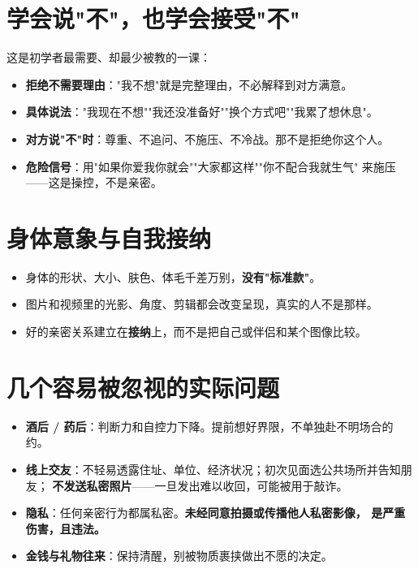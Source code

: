 \section{学会说"不"，也学会接受"不"}

这是初学者最需要、却最少被教的一课：

\begin{itemize}[leftmargin=2em]
  \item \textbf{拒绝不需要理由}："我不想"就是完整理由，不必解释到对方满意。
  \item \textbf{具体说法}："我现在不想""我还没准备好""换个方式吧""我累了想休息"。
  \item \textbf{对方说"不"时}：尊重、不追问、不施压、不冷战。那不是拒绝你这个人。
  \item \textbf{危险信号}：用"如果你爱我你就会""大家都这样""你不配合我就生气"
        来施压——这是操控，不是亲密。
\end{itemize}

\section{身体意象与自我接纳}

\begin{itemize}[leftmargin=2em]
  \item 身体的形状、大小、肤色、体毛千差万别，\textbf{没有"标准款"}。
  \item 图片和视频里的光影、角度、剪辑都会改变呈现，真实的人不是那样。
  \item 好的亲密关系建立在\textbf{接纳}上，而不是把自己或伴侣和某个图像比较。
\end{itemize}

\section{几个容易被忽视的实际问题}

\begin{itemize}[leftmargin=2em]
  \item \textbf{酒后 / 药后}：判断力和自控力下降。提前想好界限，不单独赴不明场合的约。
  \item \textbf{线上交友}：不轻易透露住址、单位、经济状况；初次见面选公共场所并告知朋友；
        \textbf{不发送私密照片}——一旦发出难以收回，可能被用于敲诈。
  \item \textbf{隐私}：任何亲密行为都属私密。\textbf{未经同意拍摄或传播他人私密影像，
        是严重伤害，且违法。}
  \item \textbf{金钱与礼物往来}：保持清醒，别被物质裹挟做出不愿的决定。
\end{itemize}

